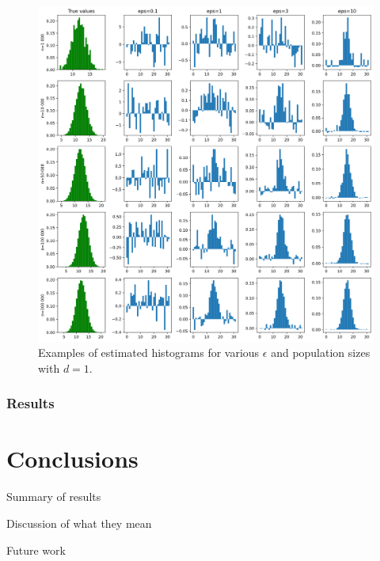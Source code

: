 \documentclass[12pt]{article}
\begin{document}
\begin{description}
    \begin{figure}
        \centering
        \includegraphics[width=\textwidth]{imgs/histogram_matrix.png}
        \caption{Examples of estimated histograms for various $\epsilon$ and population sizes with $d=1$.}
        \label{fig:histogram_matrix}
    \end{figure}
\end{description}

\subsubsection{Results}

\section{Conclusions}

Summary of results

Discussion of what they mean

Future work

\end{document}
